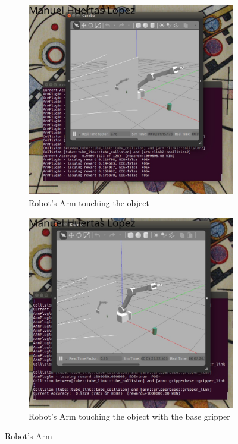 \documentclass[10pt,journal,compsoc]{IEEEtran}
\begin{document}
\begin{figure}[h]
\centering
\begin{subfigure}[b]{0.4\textwidth}
\includegraphics[scale=0.25]{Learnning_Collision_ARM}
\caption{Robot's Arm touching the object}
\end{subfigure}
\begin{subfigure}[b]{0.4\textwidth}
\includegraphics[scale=0.27]{Learnning_Collision_Gripper}
\caption{Robot's Arm touching the object with the base gripper}
\end{subfigure}
\caption{Robot's Arm}
\end{figure}
\end{document}
